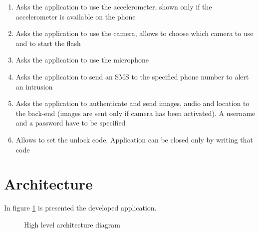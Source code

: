 \documentclass[conference, 11pt]{IEEEtran}
\begin{document}
\begin{enumerate}
	\item Asks the application to use the accelerometer, shown only if the accelerometer is available on the phone
	\item Asks the application to use the camera, allows to choose which camera to use and to start the flash
	\item Asks the application to use the microphone
	\item Asks the application to send an SMS to the specified phone number to alert an intrusion
	\item Asks the application to authenticate and send images, audio and location to the back-end (images are sent only if camera has been activated). A username and a password have to be specified
	\item Allows to set the unlock code. Application can be closed only by writing that code
\end{enumerate}

\section{\textbf{Architecture}}

In figure \ref{img:architecture} is presented the developed application.

\begin{figure}[!ht]
\begin{center}
\caption{High level architecture diagram}
\label{img:architecture}
\end{center}
\end{figure}
\end{document}
